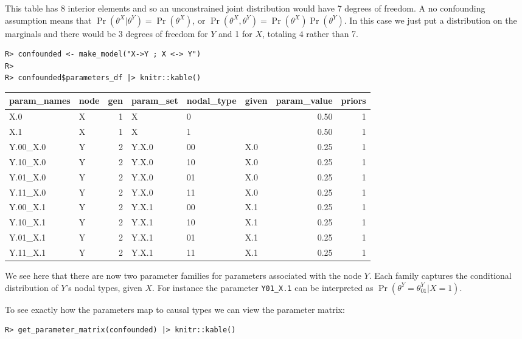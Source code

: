 \documentclass[
  11pt,
  article]{jss}
\begin{document}
This table has 8 interior elements and so an unconstrained joint
distribution would have 7 degrees of freedom. A no confounding
assumption means that \(\Pr(\theta^X | \theta^Y) = \Pr(\theta^X)\), or
\(\Pr(\theta^X, \theta^Y) = \Pr(\theta^X)\Pr(\theta^Y)\). In this case
we just put a distribution on the marginals and there would be 3 degrees
of freedom for \(Y\) and 1 for \(X\), totaling \(4\) rather than 7.

\begin{verbatim}
R> confounded <- make_model("X->Y ; X <-> Y")
R> 
R> confounded$parameters_df |> knitr::kable()
\end{verbatim}

\begin{tabular}{l|l|r|l|l|l|r|r}
\hline
param\_names & node & gen & param\_set & nodal\_type & given & param\_value & priors\\
\hline
X.0 & X & 1 & X & 0 &  & 0.50 & 1\\
\hline
X.1 & X & 1 & X & 1 &  & 0.50 & 1\\
\hline
Y.00\_X.0 & Y & 2 & Y.X.0 & 00 & X.0 & 0.25 & 1\\
\hline
Y.10\_X.0 & Y & 2 & Y.X.0 & 10 & X.0 & 0.25 & 1\\
\hline
Y.01\_X.0 & Y & 2 & Y.X.0 & 01 & X.0 & 0.25 & 1\\
\hline
Y.11\_X.0 & Y & 2 & Y.X.0 & 11 & X.0 & 0.25 & 1\\
\hline
Y.00\_X.1 & Y & 2 & Y.X.1 & 00 & X.1 & 0.25 & 1\\
\hline
Y.10\_X.1 & Y & 2 & Y.X.1 & 10 & X.1 & 0.25 & 1\\
\hline
Y.01\_X.1 & Y & 2 & Y.X.1 & 01 & X.1 & 0.25 & 1\\
\hline
Y.11\_X.1 & Y & 2 & Y.X.1 & 11 & X.1 & 0.25 & 1\\
\hline
\end{tabular}

We see here that there are now two parameter families for parameters
associated with the node \(Y\). Each family captures the conditional
distribution of \(Y\)'s nodal types, given \(X\). For instance the
parameter \texttt{Y01\_X.1} can be interpreted as
\(\Pr(\theta^Y = \theta^Y_{01} | X=1)\).

To see exactly how the parameters map to causal types we can view the
parameter matrix:

\begin{verbatim}
R> get_parameter_matrix(confounded) |> knitr::kable()
\end{verbatim}
\end{document}
